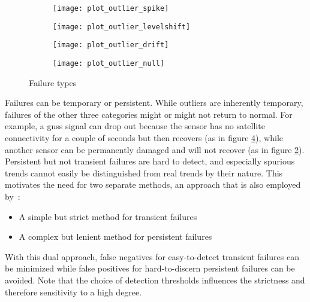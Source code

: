 \begin{figure}[h]
	\begin{subfigure}[c]{0.5\textwidth}
		\centering
		\texttt{[image: plot\_outlier\_spike]}%
		\label{fig:failure-type-outlier}
	\end{subfigure}
	\begin{subfigure}[c]{0.5\textwidth}
		\centering
		\texttt{[image: plot\_outlier\_levelshift]}%
		\label{fig:failure-type-levelshift}
	\end{subfigure}
	\begin{subfigure}[c]{0.5\textwidth}
		\centering
		\texttt{[image: plot\_outlier\_drift]}%
		\label{fig:failure-type-drift}
	\end{subfigure}
	\begin{subfigure}[c]{0.5\textwidth}
		\centering
		\texttt{[image: plot\_outlier\_null]}%
		\label{fig:failure-type-null}
	\end{subfigure}
	\caption{Failure types}
	\label{fig:failure-types}
\end{figure}

Failures can be temporary or persistent. While outliers are inherently temporary, failures of the other three categories might or might not return to normal. For example, a \gls{gnss} signal can drop out because the sensor has no satellite connectivity for a couple of seconds but then recovers (as in figure \ref{fig:failure-type-null}), while another sensor can be permanently damaged and will not recover (as in figure \ref{fig:failure-type-levelshift}). Persistent but not transient failures are hard to detect, and especially spurious trends cannot easily be distinguished from real trends by their nature. This motivates the need for two separate methods, an approach that is also employed by~\cite{Kabzan.2019}:
\begin{itemize}
\item A simple but strict method for transient failures
\item A complex but lenient method for persistent failures
\end{itemize}
With this dual approach, false negatives for easy-to-detect transient failures can be minimized while false positives for hard-to-discern persistent failures can be avoided. Note that the choice of detection thresholds influences the strictness and therefore sensitivity to a high degree.


